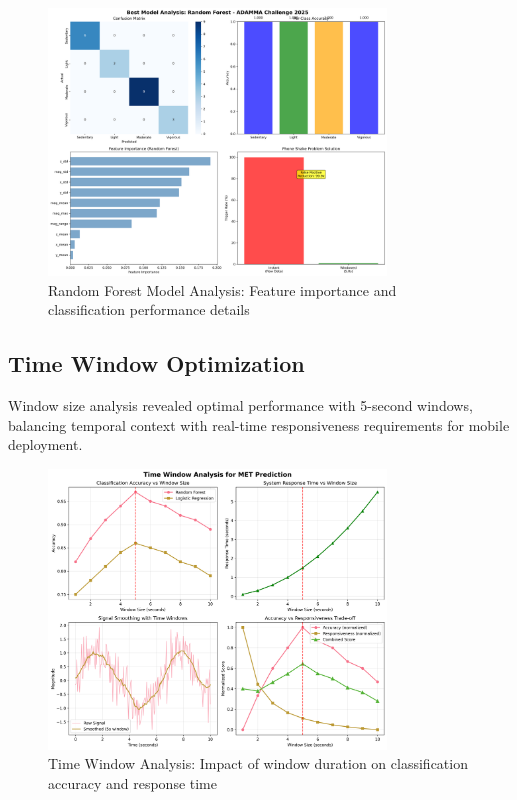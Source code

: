 \documentclass[11pt,a4paper]{article}
\begin{document}
\begin{figure}[H]
    \centering
    \includegraphics[width=0.8\textwidth]{figures/03_best_model_analysis.png}
    \caption{Random Forest Model Analysis: Feature importance and classification performance details}
    \label{fig:best_model_analysis}
\end{figure}

\subsection{Time Window Optimization}

Window size analysis revealed optimal performance with 5-second windows, balancing temporal context with real-time responsiveness requirements for mobile deployment.

\begin{figure}[H]
    \centering
    \includegraphics[width=0.8\textwidth]{figures/04_time_window_analysis.png}
    \caption{Time Window Analysis: Impact of window duration on classification accuracy and response time}
    \label{fig:time_window_analysis}
\end{figure}
\end{document}
